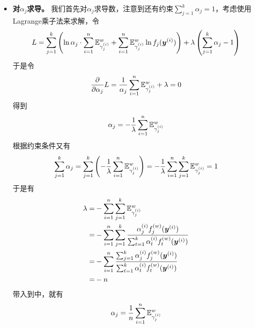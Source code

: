 \documentclass[a4paper,UTF8]{article}
\begin{document}
\begin{itemize}
    \item \textbf{ 对\(\alpha_j\)求导。} 我们首先对\(\alpha_j\)求导数，注意到还有约束\(\sum_{j=1}^k\alpha_j=1\)，考虑使用Lagrange乘子法来求解，令\begin{equation*}
        L=\sum_{j=1}^k\left( 
            \ln\alpha_j\cdot\sum_{i=1}^n\mathbb{E}_{\gamma^{(i)}_j}^w+\sum_{i=1}^n\mathbb{E}_{\gamma^{(i)}_j}^w\ln f_j(\boldsymbol{y}^{(i)})
        \right)+\lambda\left(\sum_{j=1}^k\alpha_j-1\right)
\end{equation*}于是令\begin{equation*}
        \frac{\partial}{\partial \alpha_j}L
        =\frac{1}{\alpha_j}\sum_{i=1}^n\mathbb{E}_{\gamma^{(i)}_j}^w+\lambda=0
\end{equation*}得到\begin{equation*}\label{eq:alphaj}
    \alpha_j=-\frac{1}{\lambda}\sum_{i=1}^n\mathbb{E}_{\gamma^{(i)}_j}^w
\end{equation*}根据约束条件又有\begin{equation*}
    \sum_{j=1}^k\alpha_j 
    =\sum_{j=1}^k\left(-\frac{1}{\lambda}\sum_{i=1}^n\mathbb{E}_{\gamma^{(i)}_j}^w\right)
    =-\frac{1}{\lambda}\sum_{i=1}^n\sum_{j=1}^k\mathbb{E}_{\gamma^{(i)}_j}^w
    =1
\end{equation*}于是有\begin{equation*}
    \begin{split}
        \lambda
        =&-\sum_{i=1}^{n}\sum_{j=1}^{k}\mathbb{E}_{\gamma^{(i)}_j}^w\\
        =&-\sum_{i=1}^{n}\sum_{j=1}^{k}\frac{
            \alpha_j^{(i)}f^{(w)}_j(\boldsymbol{y}^{(i)})
        }{
            \sum_{t=1}^k\alpha_t^{(i)}f^{(w)}_t(\boldsymbol{y}^{(i)})
        }\\
        =&-\sum_{i=1}^{n}\frac{
            \sum_{j=1}^{k}\alpha_j^{(i)}f^{(w)}_j(\boldsymbol{y}^{(i)})
        }{
            \sum_{t=1}^k\alpha_t^{(i)}f^{(w)}_t(\boldsymbol{y}^{(i)})
        }\\
        =&-n
    \end{split}
\end{equation*}带入到中，就有\begin{equation}
    \alpha_j=\frac{1}{n}\sum_{i=1}^n\mathbb{E}_{\gamma^{(i)}_j}^w
\end{equation}


\end{itemize}
\end{document}
